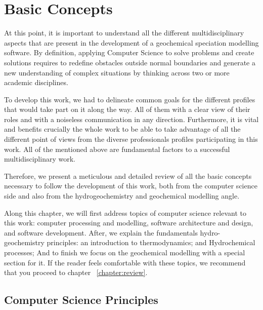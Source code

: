 \documentclass[ppgc,mestrado,english]{iiufrgs}
\begin{document}
\chapter{Basic Concepts}
\label{chapter:basic}

At this point, it is important to understand all the different multidisciplinary aspects that are present in the development of a geochemical speciation modelling software. By definition, applying Computer Science to solve problems and create solutions requires to redefine obstacles outside normal boundaries and generate a new understanding of complex situations by thinking across two or more academic disciplines. 

To develop this work, we had to delineate common goals for the different profiles that would take part on it along the way. All of them with a clear view of their roles and with a noiseless communication in any direction. Furthermore, it is vital and benefits crucially the whole work to be able to take advantage of all the different point of views from the diverse professionals profiles participating in this work. All of the mentioned above are fundamental factors to a successful multidisciplinary work.

Therefore, we present a meticulous and detailed review of all the basic concepts necessary to follow the development of this work, both from the computer science side and also from the hydrogeochemistry and geochemical modelling angle.

Along this chapter, we will first address topics of computer science relevant to this work: computer processing and modelling, software architecture and design, and software development. After, we explain the fundamentals hydro-geochemistry principles: an introduction to thermodynamics; and Hydrochemical processes; And to finish we focus on the geochemical modelling with a special section for it. If the reader feels comfortable with these topics, we recommend that you proceed to chapter ~\ref{chapter:review}.


\section{Computer Science Principles}
\end{document}
